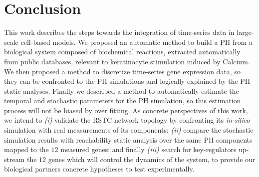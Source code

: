 \section{Conclusion}
This work describes the steps towards the integration of time-series data in large-scale cell-based models. 
We proposed an automatic method to build a PH from a biological system composed of biochemical reactions, extracted automatically from public databases, 
relevant to keratinocyte stimulation induced by Calcium. 
We then proposed a method to discretize time-series gene expression data, so they can be confronted to the PH simulations and logically explained by the PH static analyses. 
Finally we described a method to automatically estimate the temporal and stochastic
parameters for the PH simulation, so this estimation process will not be biased by over fitting.
As concrete perspectives of this work, we intend to \emph{(i)} validate the RSTC network topology by confronting its \emph{in-silico} simulation with real measurements of its components;
\emph{(ii)} compare the stochastic simulation results with reachability static analysis over the same PH components mapped to the $12$ measured genes; and 
finally \emph{(iii)} search for key-regulators up-stream the $12$ genes which will control the dynamics of the system, to  provide our biological partners concrete 
hypotheses to test experimentally.
